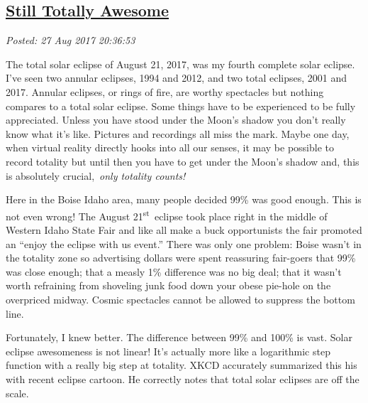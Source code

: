 %

\subsection*{\href{https://analyzethedatanotthedrivel.org/2017/08/27/still-totally-awesome/}{Still Totally Awesome}}


\noindent\emph{Posted: 27 Aug 2017 20:36:53}
\vspace{6pt}

The total solar eclipse of August 21, 2017, was my fourth complete solar
eclipse. I've seen two annular eclipses, 1994 and 2012, and two total
eclipses, 2001 and 2017. Annular eclipses, or rings of fire, are worthy
spectacles but nothing compares to a total solar eclipse. Some things
have to be experienced to be fully appreciated. Unless you have stood
under the Moon's shadow you don't really know what it's like. Pictures
and recordings all miss the mark. Maybe one day, when virtual reality
directly hooks into all our senses, it may be possible to record
totality but until then you have to get under the Moon's shadow and,
this is absolutely crucial,~\emph{only totality counts!}

Here in the Boise Idaho area, many people decided 99\% was good enough.
This is not even wrong! The August 21\textsuperscript{st}~eclipse took
place right in the middle of Western Idaho State Fair and like all make
a buck opportunists the fair promoted an ``enjoy the eclipse with us
event.'' There was only one problem: Boise wasn't in the totality zone
so advertising dollars were spent reassuring fair-goers that 99\% was
close enough; that a measly 1\% difference was no big deal; that it
wasn't worth refraining from shoveling junk food down your obese
pie-hole on the overpriced midway. Cosmic spectacles cannot be allowed
to suppress the bottom line.

Fortunately, I knew better. The difference between 99\% and 100\% is
vast. Solar eclipse awesomeness is not linear! It's actually more like a
logarithmic step function with a really big step at totality. XKCD
accurately summarized this his with recent eclipse cartoon. He correctly
notes that total solar eclipses are off the scale.



